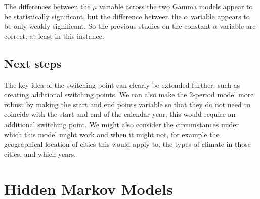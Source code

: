 \documentclass{article}
\begin{document}
The differences between the $\mu$ variable across the two Gamma models appear to be statistically significant, but the difference between the $\alpha$ variable appears to be only weakly significant. So the previous studies on the constant $\alpha$ variable are correct, at least in this instance.

\subsection{Next steps}
The key idea of the switching point can clearly be extended further, such as creating additional switching points. We can also make the 2-period model more robust by making the start and end points variable so that they do not need to coincide with the start and end of the calendar year; this would require an additional switching point. We might also consider the circumstances under which this model might work and when it might not, for example the geographical location of cities this would apply to, the types of climate in those cities, and which years.

\section{Hidden Markov Models}


\onehalfspacing


\end{document}
